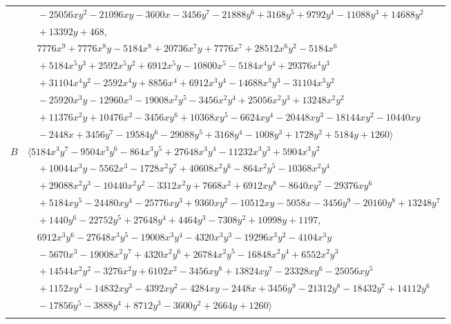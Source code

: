 \documentclass[11pt]{article}
\begin{document}
\begin{longtable}{@{}ll@{}}
 & $\quad -25056xy^{2}-21096xy-3600x-3456y^{7}-21888y^{6}+3168y^{5}+9792y^{4}-11088y^{3}+14688y^{2}$\\
 & $\quad +13392y+468,$\\
 & $\quad 7776x^{9}+7776x^{8}y-5184x^{8}+20736x^{7}y+7776x^{7}+28512x^{6}y^{2}-5184x^{6}$\\
 & $\quad +5184x^{5}y^{3}+2592x^{5}y^{2}+6912x^{5}y-10800x^{5}-5184x^{4}y^{4}+29376x^{4}y^{3}$\\
 & $\quad +31104x^{4}y^{2}-2592x^{4}y+8856x^{4}+6912x^{3}y^{4}-14688x^{3}y^{3}-31104x^{3}y^{2}$\\
 & $\quad -25920x^{3}y-12960x^{3}-19008x^{2}y^{5}-3456x^{2}y^{4}+25056x^{2}y^{3}+13248x^{2}y^{2}$\\
 & $\quad +11376x^{2}y+10476x^{2}-3456xy^{6}+10368xy^{5}-6624xy^{4}-20448xy^{3}-18144xy^{2}-10440xy$\\
 & $\quad -2448x+3456y^{7}-19584y^{6}-29088y^{5}+3168y^{4}-1008y^{3}+1728y^{2}+5184y+1260\rangle$\\
$B$ & $\langle 5184x^{3}y^{7}-9504x^{3}y^{6}-864x^{3}y^{5}+27648x^{3}y^{4}-11232x^{3}y^{3}+5904x^{3}y^{2}$\\
 & $\quad +10044x^{3}y-5562x^{3}-1728x^{2}y^{7}+40608x^{2}y^{6}-864x^{2}y^{5}-10368x^{2}y^{4}$\\
 & $\quad +29088x^{2}y^{3}-10440x^{2}y^{2}-3312x^{2}y+7668x^{2}+6912xy^{8}-8640xy^{7}-29376xy^{6}$\\
 & $\quad +5184xy^{5}-24480xy^{4}-25776xy^{3}+9360xy^{2}-10512xy-5058x-3456y^{9}-20160y^{8}+13248y^{7}$\\
 & $\quad +1440y^{6}-22752y^{5}+27648y^{4}+4464y^{3}-7308y^{2}+10998y+1197,$\\
 & $\quad 6912x^{3}y^{6}-27648x^{3}y^{5}-19008x^{3}y^{4}-4320x^{3}y^{3}-19296x^{3}y^{2}-4104x^{3}y$\\
 & $\quad -5670x^{3}-19008x^{2}y^{7}+4320x^{2}y^{6}+26784x^{2}y^{5}-16848x^{2}y^{4}+6552x^{2}y^{3}$\\
 & $\quad +14544x^{2}y^{2}-3276x^{2}y+6102x^{2}-3456xy^{8}+13824xy^{7}-23328xy^{6}-25056xy^{5}$\\
 & $\quad +1152xy^{4}-14832xy^{3}-4392xy^{2}-4284xy-2448x+3456y^{9}-21312y^{8}-18432y^{7}+14112y^{6}$\\
 & $\quad -17856y^{5}-3888y^{4}+8712y^{3}-3600y^{2}+2664y+1260\rangle$\\
\addlinespace[2pt]
\multicolumn{2}{@{}p{0.97\textwidth}@{}}{$i=6$, $D_i=9$, $e_i=0$, $\rho_{ij}$: $10{:}1, \allowbreak 13{:}2, \allowbreak 26{:}1, \allowbreak 35{:}2, \allowbreak 44{:}2, \allowbreak 50{:}2, \allowbreak 64{:}2$}\\

\end{longtable}
\end{document}
